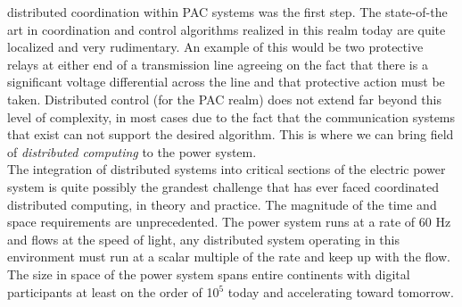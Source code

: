 \documentclass{article}
\begin{document}
distributed coordination within PAC systems was the first step.  The state-of-the art 
in coordination and control algorithms realized in this realm today are quite localized 
and very rudimentary.  An example of this would be two protective relays at either end 
of a transmission line agreeing on the fact that there is a significant voltage 
differential across the line and that protective action must be taken.  Distributed 
control (for the PAC realm) does not extend far beyond this level of complexity, in 
most cases due to the fact that the communication systems that exist can not support 
the desired algorithm.  This is where we can bring field of \emph{distributed computing} 
to the power system.\\

The integration of distributed systems into critical sections of the electric power 
system is quite possibly the grandest challenge that has ever faced coordinated 
distributed computing, in theory and practice.  The magnitude of the time and space 
requirements are unprecedented.  The power system runs at a rate of 60 Hz and flows 
at the speed of light, any distributed system operating in this environment must run 
at a scalar multiple of the rate and keep up with the flow.  The size in space of the 
power system spans entire continents with digital participants at least on the order of 
10$^{5}$ today and accelerating toward tomorrow. \\
\end{document}

